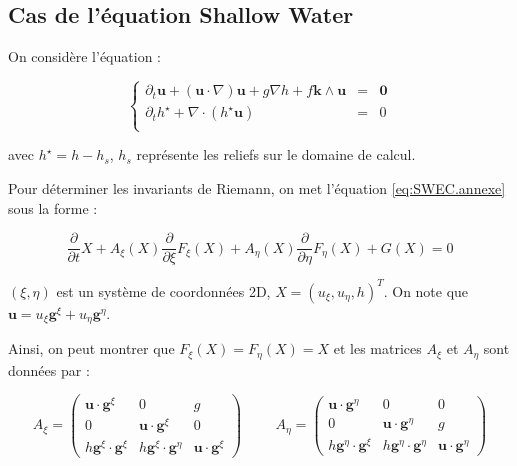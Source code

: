 \subsection{Cas de l'équation Shallow Water}

On considère l'équation :

\begin{equation}
\left\lbrace
\begin{array}{rcl}
\partial_t \mathbf{u} + \left( \mathbf{u} \cdot \nabla \right) \mathbf{u} + g \nabla h + f \mathbf{k} \wedge \mathbf{u} & = & \mathbf{0}\\
\partial_t h^{\star} + \nabla \cdot \left( h^{\star} \mathbf{u} \right) & = & 0 \\ 
\end{array}
\right.
\label{eq:SWEC.annexe}
\end{equation}

avec $h^{\star} = h - h_s$, $h_s$ représente les reliefs sur le domaine de calcul.

Pour déterminer les invariants de Riemann, on met l'équation \eqref{eq:SWEC.annexe} sous la forme :

\begin{equation}
\dfrac{\partial}{\partial t} X + A_{\xi}(X) \dfrac{\partial}{\partial \xi} F_{\xi}(X) + A_{\eta}(X) \dfrac{\partial}{\partial \eta} F_{\eta}(X) + G(X) = 0
\end{equation}

$(\xi, \eta)$ est un système de coordonnées 2D, $X=(u_{\xi}, u_{\eta}, h)^T$. On note que $\mathbf{u} = u_{\xi} \mathbf{g}^{\xi}+u_{\eta} \mathbf{g}^{\eta}$. 

Ainsi, on peut montrer que $F_{\xi}(X) = F_{\eta}(X) = X$ et les matrices $A_{\xi}$ et $A_{\eta}$ sont données par :

\begin{equation}
A_{\xi} = \begin{pmatrix}
\mathbf{u} \cdot \mathbf{g}^{\xi} & 0 & g \\
0 & \mathbf{u} \cdot \mathbf{g}^{\xi} & 0 \\
h \mathbf{g}^{\xi} \cdot \mathbf{g}^{\xi} & h \mathbf{g}^{\xi} \cdot \mathbf{g}^{\eta} & \mathbf{u} \cdot \mathbf{g}^{\xi} 
\end{pmatrix}
\hspace{1cm}
A_{\eta} = \begin{pmatrix}
\mathbf{u} \cdot \mathbf{g}^{\eta} & 0 & 0 \\
0 & \mathbf{u} \cdot \mathbf{g}^{\eta}  & g \\
h \mathbf{g}^{\eta} \cdot \mathbf{g}^{\xi}  & h \mathbf{g}^{\eta} \cdot \mathbf{g}^{\eta}  & \mathbf{u} \cdot \mathbf{g}^{\eta} 
\end{pmatrix}
\end{equation}

